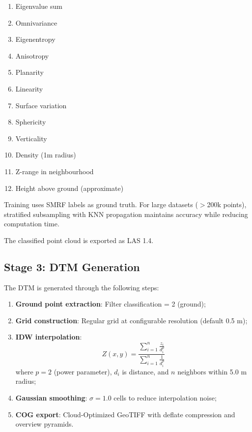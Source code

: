 \documentclass[a4paper,12pt]{article}
\begin{document}
\begin{enumerate}
	\item Eigenvalue sum
	\item Omnivariance
	\item Eigenentropy
	\item Anisotropy
	\item Planarity
	\item Linearity
	\item Surface variation
	\item Sphericity
	\item Verticality
	\item Density (1m radius)
	\item Z-range in neighbourhood
	\item Height above ground (approximate)
\end{enumerate}

Training uses SMRF labels as ground truth. For large datasets ($>$200k points), stratified subsampling with KNN propagation maintains accuracy while reducing computation time.

The classified point cloud is exported as LAS 1.4.

\subsection{Stage 3: DTM Generation}

The DTM is generated through the following steps:

\begin{enumerate}
	\item \textbf{Ground point extraction}: Filter classification = 2 (ground);
	\item \textbf{Grid construction}: Regular grid at configurable resolution (default 0.5 m);
	\item \textbf{IDW interpolation}:
	      \begin{equation}
		      Z(x,y) = \frac{\sum_{i=1}^{n} \frac{z_i}{d_i^p}}{\sum_{i=1}^{n} \frac{1}{d_i^p}}
	      \end{equation}
	      where $p=2$ (power parameter), $d_i$ is distance, and $n$ neighbors within 5.0 m radius;
	\item \textbf{Gaussian smoothing}: $\sigma=1.0$ cells to reduce interpolation noise;
	\item \textbf{COG export}: Cloud-Optimized GeoTIFF with deflate compression and overview pyramids.
\end{enumerate}
\end{document}
